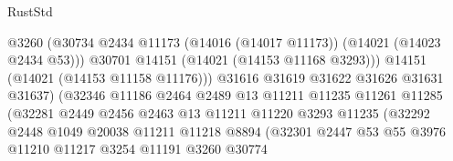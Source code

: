 \begin{lexlean}{RustStd}
\begin{coremodule}
                                          @3260
                                          (@30734
                                            @2434
                                            @11173
                                            (@14016 (@14017 @11173))
                                            (@14021 (@14023 @2434 @53)))
                                          @30701
                                          @14151
                                          (@14021 (@14153 @11168 @3293)))
                                        @14151
                                        (@14021 (@14153 @11158 @11176)))
                                      @31616
                                      @31619
                                      @31622
                                      @31626
                                      @31631
                                      @31637)
                                    (@32346
                                      @11186
                                      @2464
                                      @2489
                                      @13
                                      @11211
                                      @11235
                                      @11261
                                      @11285
                                      (@32281
                                        @2449
                                        @2456
                                        @2463
                                        @13
                                        @11211
                                        @11220
                                        @3293
                                        @11235
                                        (@32292
                                          @2448
                                          @1049
                                          @20038
                                          @11211
                                          @11218
                                          @8894
                                          (@32301
                                            @2447
                                            @53
                                            @55
                                            @3976
                                            @11210
                                            @11217
                                            @3254
                                            @11191
                                            @3260
                                            @30774

\end{coremodule}
\end{lexlean}
